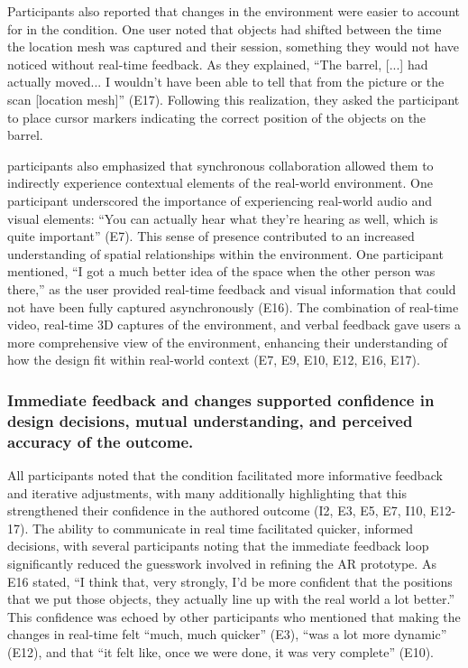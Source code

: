 Participants also reported that changes in the environment were easier to account for in the \sync condition. One \exsitu user noted that objects had shifted between the time the location mesh was captured and their session, something they would not have noticed without real-time feedback. As they explained, ``The barrel, [...] had actually moved... I wouldn't have been able to tell that from the picture or the scan [location mesh]'' (E17). Following this realization, they asked the \insitu participant to place cursor markers indicating the correct position of the objects on the barrel.

\Exsitu participants also emphasized that synchronous collaboration allowed them to indirectly experience contextual elements of the real-world environment. One participant underscored the importance of experiencing real-world audio and visual elements: ``You can actually hear what they're hearing as well, which is quite important'' (E7). This sense of presence contributed to an increased understanding of spatial relationships within the environment. One participant mentioned, ``I got a much better idea of the space when the other person was there,'' as the \insitu user provided real-time feedback and visual information that could not have been fully captured asynchronously (E16). The combination of real-time video, real-time 3D captures of the environment, and verbal feedback gave \exsitu users a more comprehensive view of the environment, enhancing their understanding of how the design fit within real-world context (E7, E9, E10, E12, E16, E17).

\subsubsection{\textbf{Immediate feedback and changes supported confidence in design decisions, mutual understanding, and perceived accuracy of the outcome.}}\label{sec:results:interviews:immedate_feedback}

All \exsitu participants noted that the \sync condition facilitated more informative feedback and iterative adjustments, with many additionally highlighting that this strengthened their confidence in the authored outcome (I2, E3, E5, E7, I10, E12-17).
The ability to communicate in real time facilitated quicker, informed decisions, with several \exsitu participants noting that the immediate feedback loop significantly reduced the guesswork involved in refining the AR prototype. As E16 stated, ``I think that, very strongly, I'd be more confident that the positions that we put those objects, they actually line up with the real world a lot better.'' This confidence was echoed by other \exsitu participants who mentioned that making the changes in real-time felt ``much, much quicker'' (E3), ``was a lot more dynamic'' (E12), and that ``it felt like, once we were done, it was very complete'' (E10).

